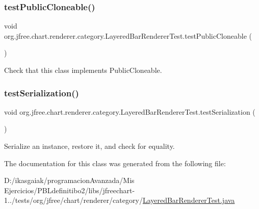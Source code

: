 \subsubsection{\texorpdfstring{test\+Public\+Cloneable()}{testPublicCloneable()}}
{\footnotesize\ttfamily void org.\+jfree.\+chart.\+renderer.\+category.\+Layered\+Bar\+Renderer\+Test.\+test\+Public\+Cloneable (\begin{DoxyParamCaption}{ }\end{DoxyParamCaption})}

Check that this class implements Public\+Cloneable. \mbox{\label{classorg_1_1jfree_1_1chart_1_1renderer_1_1category_1_1_layered_bar_renderer_test_a3d6234d17e75f36be8f12fbf4ea0ba52}} 
\subsubsection{\texorpdfstring{test\+Serialization()}{testSerialization()}}
{\footnotesize\ttfamily void org.\+jfree.\+chart.\+renderer.\+category.\+Layered\+Bar\+Renderer\+Test.\+test\+Serialization (\begin{DoxyParamCaption}{ }\end{DoxyParamCaption})}

Serialize an instance, restore it, and check for equality. 

The documentation for this class was generated from the following file\+:\begin{DoxyCompactItemize}
\item 
D\+:/ikasgaiak/programacion\+Avanzada/\+Mis Ejercicios/\+P\+B\+Ldefinitibo2/libs/jfreechart-\/1../tests/org/jfree/chart/renderer/category/\mbox{\hyperlink{_layered_bar_renderer_test_8java}{Layered\+Bar\+Renderer\+Test.\+java}}\end{DoxyCompactItemize}
